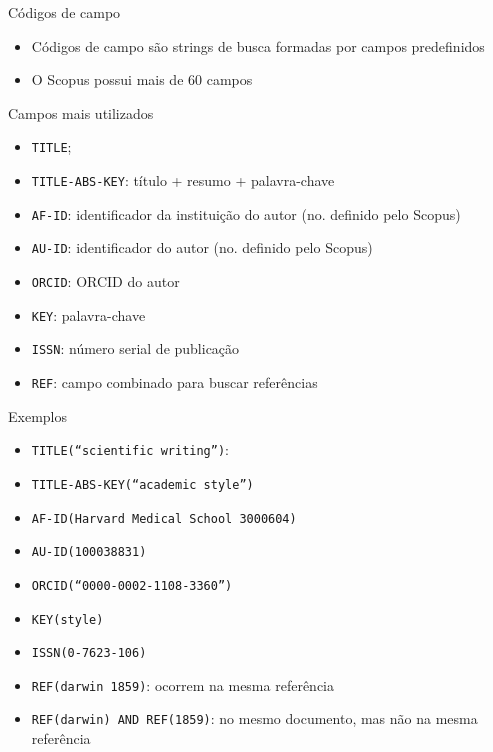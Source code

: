 \begin{frame}{Códigos de campo}
\begin{itemize}
\item Códigos de campo são strings de busca formadas por campos predefinidos 
\item O Scopus possui mais de 60 campos 
\end{itemize}
\end{frame}


\begin{frame}{Campos mais utilizados}
\begin{itemize}
\item \texttt{TITLE}; 
\item \texttt{TITLE-ABS-KEY}: título + resumo + palavra-chave
\item \texttt{AF-ID}: identificador da instituição do autor (no. definido pelo Scopus)
\item \texttt{AU-ID}: identificador do autor (no. definido pelo Scopus)
\item \texttt{ORCID}: ORCID do autor
\item \texttt{KEY}: palavra-chave
\item \texttt{ISSN}: número serial de publicação
\item \texttt{REF}: campo combinado para buscar referências
\end{itemize}
\end{frame}

\begin{frame}{Exemplos}
\begin{itemize}
\item \texttt{TITLE(``scientific writing'')}: 
\item \texttt{TITLE-ABS-KEY(``academic style'')}
\item \texttt{AF-ID(Harvard Medical School 3000604)}
\item \texttt{AU-ID(100038831)} 
\item \texttt{ORCID(``0000-0002-1108-3360'')}
\item \texttt{KEY(style)}
\item \texttt{ISSN(0-7623-106)}
\item \texttt{REF(darwin 1859)}: ocorrem na mesma referência
\item \texttt{REF(darwin) AND REF(1859)}: no mesmo documento, mas não na mesma referência
\end{itemize}
\end{frame}

